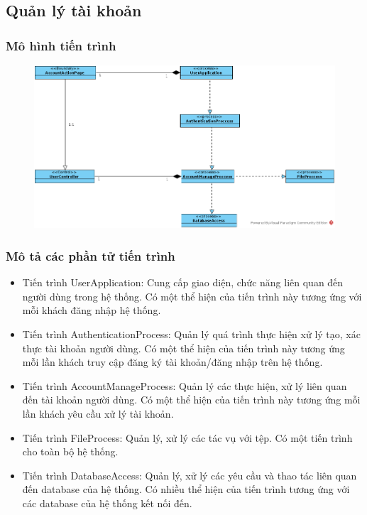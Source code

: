 \documentclass[./../main_file.tex]{subfiles}
\begin{document}
\subsection{Quản lý tài khoản}

\subsubsection{Mô hình tiến trình}

\begin{figure}[H]
	\centering
	\includegraphics[width=\linewidth]{./images/pv_account_manage.png}
\end{figure}

\subsubsection{Mô tả các phần tử tiến trình}
\begin{itemize}
	\item Tiến trình UserApplication: Cung cấp giao diện, chức năng liên quan đến người dùng trong hệ thống. Có một thể hiện của tiến trình này tương ứng với mỗi khách đăng nhập hệ thống.
	\item Tiến trình AuthenticationProcess: Quản lý quá trình thực hiện xử lý tạo, xác thực tài khoản người dùng.
	Có một thể hiện của tiến trình này tương ứng mỗi lần khách truy cập đăng ký tài khoản/đăng nhập trên hệ thống.
\item Tiến trình AccountManageProcess: Quản lý các thực hiện, xử lý liên quan đến tài khoản người dùng.
	Có một thể hiện của tiến trình này tương ứng mỗi lần khách yêu cầu xử lý tài khoản.
	\item Tiến trình FileProcess: Quản lý, xử lý các tác vụ với tệp.
	Có một tiến trình cho toàn bộ hệ thống.
	\item Tiến trình DatabaseAccess: Quản lý, xử lý các yêu cầu và thao tác liên quan đến database của hệ thống. Có nhiều thể hiện của tiến trình tương ứng với các database của hệ thống kết nối đến.
\end{itemize}
\end{document}
